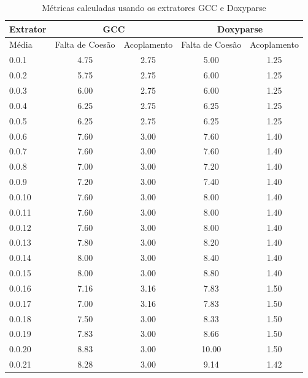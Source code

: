 \begin{table}
\caption{Métricas calculadas usando os extratores GCC e Doxyparse}
\centering
\begin{tabular}{| l | c c | c c |}
\hline
Extrator  & \multicolumn{2}{|c|}{GCC}        & \multicolumn{2}{|c|}{Doxyparse} \\
\hline
Média     & Falta de Coesão & Acoplamento    & Falta de Coesão & Acoplamento   \\
\hline
0.0.1     & 4.75            & 2.75           & 5.00            & 1.25          \\
0.0.2     & 5.75            & 2.75           & 6.00            & 1.25          \\
0.0.3     & 6.00            & 2.75           & 6.00            & 1.25          \\
0.0.4     & 6.25            & 2.75           & 6.25            & 1.25          \\
0.0.5     & 6.25            & 2.75           & 6.25            & 1.25          \\
0.0.6     & 7.60            & 3.00           & 7.60            & 1.40          \\
0.0.7     & 7.60            & 3.00           & 7.60            & 1.40          \\
0.0.8     & 7.00            & 3.00           & 7.20            & 1.40          \\
0.0.9     & 7.20            & 3.00           & 7.40            & 1.40          \\
0.0.10    & 7.60            & 3.00           & 8.00            & 1.40          \\
0.0.11    & 7.60            & 3.00           & 8.00            & 1.40          \\
0.0.12    & 7.60            & 3.00           & 8.00            & 1.40          \\
0.0.13    & 7.80            & 3.00           & 8.20            & 1.40          \\
0.0.14    & 8.00            & 3.00           & 8.40            & 1.40          \\
0.0.15    & 8.00            & 3.00           & 8.80            & 1.40          \\
0.0.16    & 7.16            & 3.16           & 7.83            & 1.50          \\
0.0.17    & 7.00            & 3.16           & 7.83            & 1.50          \\
0.0.18    & 7.50            & 3.00           & 8.33            & 1.50          \\
0.0.19    & 7.83            & 3.00           & 8.66            & 1.50          \\
0.0.20    & 8.83            & 3.00           & 10.00           & 1.50          \\
0.0.21    & 8.28            & 3.00           & 9.14            & 1.42          \\
\hline
\end{tabular}
\label{tab:comparacao-metricas}
\end{table}

